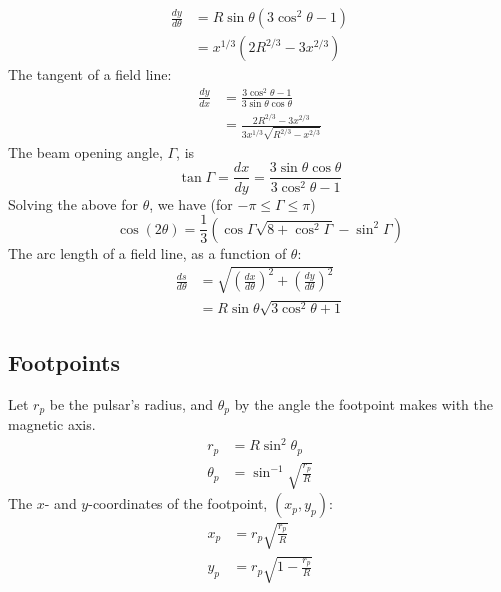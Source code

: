 \documentclass[twocolumn]{article}
\newcommand{\deriv}[2]{\frac{d{#1}}{d{#2}}}
\begin{document}
\begin{equation}
    \begin{aligned}
        \deriv{y}{\theta} &= R\sin\theta(3\cos^2\theta - 1) \\
                          &= x^{1/3}(2R^{2/3} - 3x^{2/3})
    \end{aligned}
\end{equation}
The tangent of a field line:
\begin{equation}
    \begin{aligned}
        \deriv{y}{x} &= \frac{3\cos^2\theta-1}{3\sin\theta\cos\theta} \\
                     &= \frac{2R^{2/3} - 3x^{2/3}}{3x^{1/3}\sqrt{R^{2/3} - x^{2/3}}}
    \end{aligned}
\end{equation}
The beam opening angle, $\Gamma$, is
\begin{equation}
    \tan\Gamma = \deriv{x}{y} = \frac{3\sin\theta\cos\theta}{3\cos^2\theta-1}
\end{equation}
Solving the above for $\theta$, we have (for $-\pi \le \Gamma \le \pi$)
\begin{equation}
    \cos(2\theta) = \frac13 \left(\cos\Gamma\sqrt{8+\cos^2\Gamma} - \sin^2\Gamma\right)
\end{equation}
The arc length of a field line, as a function of $\theta$:
\begin{equation}
    \begin{aligned}
        \deriv{s}{\theta} &= \sqrt{\left(\deriv{x}{\theta}\right)^2 + \left(\deriv{y}{\theta}\right)^2} \\
                          &= R\sin\theta \sqrt{3\cos^2\theta + 1}
    \end{aligned}
\end{equation}

\subsection{Footpoints}

Let $r_p$ be the pulsar's radius, and $\theta_p$ by the angle the footpoint makes with the magnetic axis.
\begin{align}
    r_p &= R\sin^2\theta_p \\
    \theta_p &= \sin^{-1}\sqrt{\frac{r_p}{R}}
\end{align}
The $x$- and $y$-coordinates of the footpoint, $(x_p,y_p)$:
\begin{align}
    x_p &= r_p\sqrt{\frac{r_p}{R}} \\
    y_p &= r_p \sqrt{1 - \frac{r_p}{R}}
\end{align}
\end{document}

